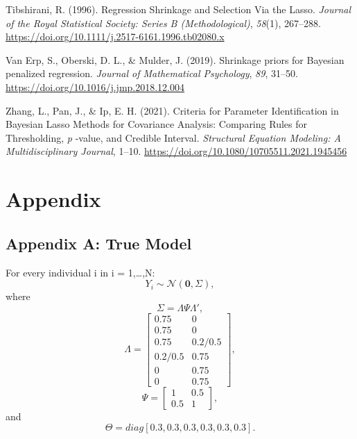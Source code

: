 \documentclass[
  english,
  man]{apa6}
\newlength{\cslhangindent}
\newlength{\cslentryspacingunit} %
\newenvironment{CSLReferences}[2] %
 {%
  \setlength{\parindent}{0pt}
  \ifodd #1
  \let\oldpar\par
  \def\par{\hangindent=\cslhangindent\oldpar}
  \fi
  \setlength{\parskip}{#2\cslentryspacingunit}
 }%
 {}
\begin{document}
\begin{CSLReferences}{1}{0}
\leavevmode{}%
Tibshirani, R. (1996). Regression {Shrinkage} and {Selection} {Via} the {Lasso}. \emph{Journal of the Royal Statistical Society: Series B (Methodological)}, \emph{58}(1), 267--288. \url{https://doi.org/10.1111/j.2517-6161.1996.tb02080.x}

\leavevmode{}%
Van Erp, S., Oberski, D. L., \& Mulder, J. (2019). Shrinkage priors for {Bayesian} penalized regression. \emph{Journal of Mathematical Psychology}, \emph{89}, 31--50. \url{https://doi.org/10.1016/j.jmp.2018.12.004}

\leavevmode{}%
Zhang, L., Pan, J., \& Ip, E. H. (2021). Criteria for {Parameter} {Identification} in {Bayesian} {Lasso} {Methods} for {Covariance} {Analysis}: {Comparing} {Rules} for {Thresholding}, \emph{p} -value, and {Credible} {Interval}. \emph{Structural Equation Modeling: A Multidisciplinary Journal}, 1--10. \url{https://doi.org/10.1080/10705511.2021.1945456}

\end{CSLReferences}

\endgroup

\clearpage

\hypertarget{appendix}{%
\section{Appendix}\label{appendix}}

\hypertarget{appendix-a-true-model}{%
\subsection{Appendix A: True Model}\label{appendix-a-true-model}}

For every individual i in i = 1,\ldots,N:
\[Y_i \sim \mathcal{N}(\mathbf{0}, \Sigma),\] where
\[\Sigma = \Lambda\Psi\Lambda',\]
\[\Lambda = 
    \begin{bmatrix}
    0.75 & 0 \\
    0.75 & 0 \\
    0.75 & 0.2/0.5 \\
    0.2/0.5 & 0.75 \\
    0 & 0.75 \\
    0 & 0.75
    \end{bmatrix},\]
\[\Psi =
    \begin{bmatrix}
     1 & 0.5 \\
     0.5 & 1
    \end{bmatrix}
,\] and
\[\Theta = diag[0.3, 0.3, 0.3, 0.3, 0.3, 0.3].\]
\end{document}
